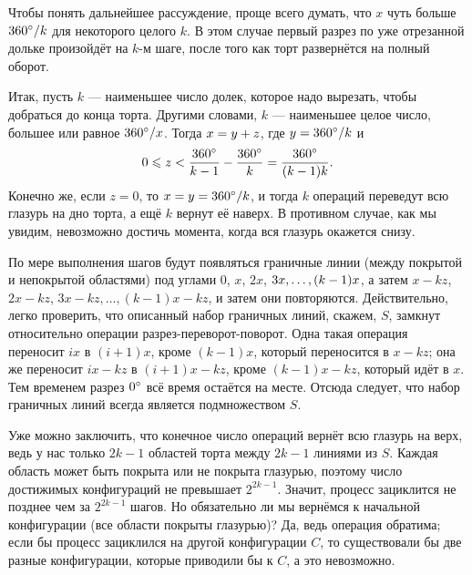 Чтобы понять дальнейшее рассуждение, проще всего думать, что $x$ чуть больше $360\degree/k$ для некоторого целого $k$.
В этом случае первый разрез по уже отрезанной дольке произойдёт на $k$-м шаге, после того как торт развернётся на полный оборот.

Итак, пусть $k$ --- наименьшее число долек, которое надо вырезать, чтобы добраться до конца торта.
Другими словами, $k$ --- наименьшее целое число, большее или равное $360\degree/x$.
Тогда $x \z= y + z$, где $y \z= 360\degree/k$ и 
\[0\leqslant z <\frac{360\degree}{k-1}-\frac{360\degree}{k}=\frac{360\degree}{(k-1)k}.\]
Конечно же, если $z = 0$, то $x = y = 360\degree/k$, и тогда $k$ операций переведут всю глазурь на дно торта, а ещё $k$ вернут её наверх.
В противном случае, как мы увидим, невозможно достичь момента, когда вся глазурь окажется снизу.

По мере выполнения шагов будут появляться граничные линии (между покрытой и непокрытой областями) под углами $0$, $x$, $2x$, $3x, \z\dots , (k - 1)x$, а затем $x - kz$, $2x - kz$, $3x - kz, \dots , (k - 1)x - kz$,
и затем они повторяются.
Действительно, легко проверить, что описанный набор граничных линий, скажем, $S$, замкнут относительно операции разрез-переворот-поворот.
Одна такая операция переносит $ix$ в $(i + 1)x$, кроме $(k - 1)x$, который переносится в $x - kz$;
она же переносит $ix - kz$ в $(i + 1)x - kz$, кроме $(k - 1)x - kz$, который идёт в $x$.
Тем временем разрез $0\degree$ всё время остаётся на месте.
Отсюда следует, что набор граничных линий всегда является подмножеством $S$.

Уже можно заключить, что конечное число операций вернёт всю глазурь на верх, ведь у нас только $2k - 1$ областей торта между $2k - 1$ линиями из $S$.
Каждая область может быть покрыта или не покрыта глазурью, поэтому число достижимых конфигураций не превышает $2^{2k-1}$.
Значит, процесс зациклится не позднее чем за $2^{2k-1}$ шагов.
Но обязательно ли мы вернёмся к начальной конфигурации (все области покрыты глазурью)?
Да, ведь операция обратима;
если бы процесс зациклился на другой конфигурации $C$, то существовали бы две разные конфигурации, которые приводили бы к $C$, а это невозможно.

